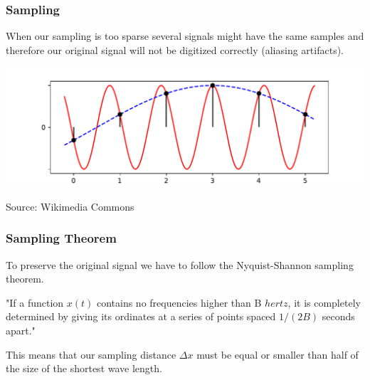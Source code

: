 \begin{frame}
    \frametitle{Sampling}
    When our sampling is too sparse several signals might have the same samples and therefore our original signal will not be digitized correctly (aliasing artifacts).\newline

    \begin{center}
        \includegraphics[height=.4\textheight ]{images/AliasingSines.pdf}
        \begin{flushright}
            \scriptsize Source: Wikimedia Commons$\quad$
        \end{flushright}
    \end{center}
\end{frame}



\begin{frame}
    \frametitle{Sampling Theorem}
    To preserve the original signal we have to follow the Nyquist-Shannon sampling theorem.\newline

    \begin{myDefinition}
        "If a function $x(t)$ contains no frequencies higher than B $hertz$, it is completely determined by giving its ordinates at a series of points spaced $1/(2B)$ seconds apart."
    \end{myDefinition}

    \vspace{5mm}

    This means that our sampling distance $\Delta x$ must be equal or smaller than half of the size of the shortest wave length.
\end{frame}

